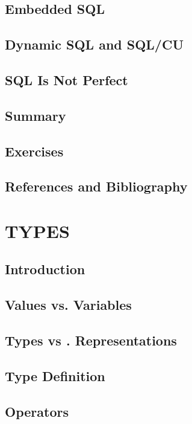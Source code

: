 \documentclass{book}
\begin{document}
\section{Embedded SQL}

\section{Dynamic SQL and SQL/CU}

\section{SQL Is Not Perfect}

\section{Summary}

\section{Exercises}

\section{References and Bibliography}





\chapter{TYPES}


\section{Introduction}

\section{Values vs. Variables}

\section{Types vs . Representations}

\section{Type Definition}

\section{Operators}
\end{document}
